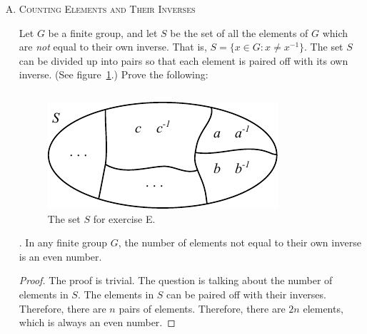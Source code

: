 \documentclass[twoside]{amsart}
\newcommand{\Blank}{\mathrel{\phantom{=}}}
\begin{document}
\begin{enumerate}[A.]
   . Let $c=c^{-1}$. Then $ab=c$ iff $abc=e$.
   \begin{proof}
      \begin{align*}
            & \Blank      && \text{First case} \\
         ab & = c         && \text{Given} \\
	 ab & = c^{-1}    && \text{Substitute} \\
	 abc & = c^{-1}c  && \text{Mult by $c$} \\
	 abc & = e        \\
	     & \Blank     && \text{Second case} \\
	 abc & = e        && \text{Given} \\
	 abcc^{-1} & = c^{-1} && \text{Mult by $c^{-1}$} \\
	 abc & = c^{-1}   \\
	 abc & = c        && \text{Substitute} \qedhere
      \end{align*}
   \end{proof}

   \item \textsc{Counting Elements and Their Inverses}

   \noindent Let $G$ be a finite group, and let $S$ be the set of all the
   elements of $G$ which are \emph{not} equal to their own inverse. That is, $S
   = \{ x \in G : x \ne x^{-1} \}$. The set $S$ can be divided up into pairs so
   that each element is paired off with its own inverse. (See
   figure~\ref{fig:chap4E}.) Prove the following:

   \begin{figure}
   \caption{The set $S$ for exercise E.}
   \label{fig:chap4E}
   \scriptsize{\begin{verbatim}

   \end{verbatim}}
   \includegraphics{img/chap4e.pdf}
   \end{figure}

   . In any finite group $G$, the number of elements not equal to 
   their own inverse is an even number.
   \begin{proof}
   The proof is trivial. The question is talking about the number of elements
   in $S$. The elements in $S$ can be paired off with their inverses. Therefore,
   there are $n$ pairs of elements. Therefore, there are $2n$ elements, which
   is always an even number.
   \end{proof}


\end{enumerate}
\end{document}
